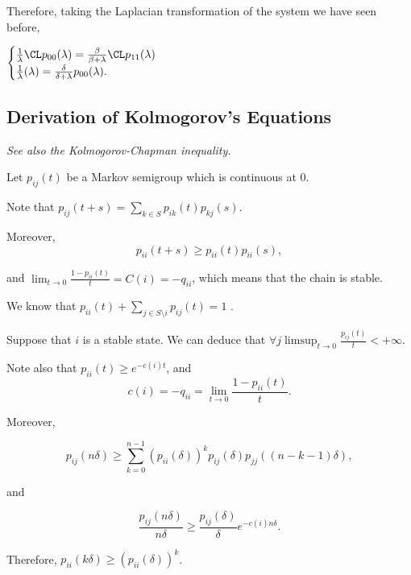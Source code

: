 \documentclass[11pt]{scrartcl}
\begin{document}
  Therefore, taking the Laplacian transformation of the system we have seen before, 

  $\begin{cases}
    \frac{1}{\lambda} \CL p_{00}(\lambda) = \frac{\beta}{\beta+\lambda}\CL p_{11}(\lambda)\\
    \frac{1}{\lambda}(\lambda) = \frac{\delta}{\delta+\lambda} p_{00}(\lambda).
  \end{cases}$

  \subsection{Derivation of Kolmogorov's Equations}

  \textit{See also the Kolmogorov-Chapman inequality.}

  Let $p_{ij}(t)$ be a Markov semigroup which is continuous at 0.

  Note that $p_{ij}(t+s) = \sum_{k\in S}p_{ik}(t)p_{kj}(s)$.

  Moreover,
  \begin{equation*}
    p_{ii}(t+s) \geq p_{ii}(t)p_{ii}(s),
  \end{equation*}

  and $\lim_{t\to 0} \frac{1- p_{ii}(t)}{t} = C(i) = - q_{ii}$, which
  means that the chain is stable.

  We know that $p_{ii}(t) + \sum_{j\in S\setminus i} p_{ij}(t) = 1$ .

  Suppose that $i$ is a stable state. We can deduce that
  $\forall j \limsup_{t\to 0}\frac{p_{ij}(t)}{t} < + \infty$.

  Note also that $p_{ii}(t) \geq e^{-c(i) t}$, and
  \begin{equation*}
    c(i) = -q_{ii} = \lim_{t\to 0}\frac{1-p_{ii}(t)}{t}.
  \end{equation*}

  Moreover,

  \begin{equation*}
    p_{ij}(n\delta) \geq \sum_{k=0}^{n-1}(p_{ii}(\delta))^{k}p_{ij}(\delta)p_{jj}((n-k-1)\delta),
  \end{equation*}

  and

  \begin{equation*}
    \frac{p_{ij}(n\delta)}{n\delta} \geq \frac{p_{ij}(\delta)}{\delta}e^{-c(i)n\delta}.
  \end{equation*}

  Therefore, $p_{ii}(k\delta) \geq (p_{ii}(\delta))^{k}$.
\end{document}
